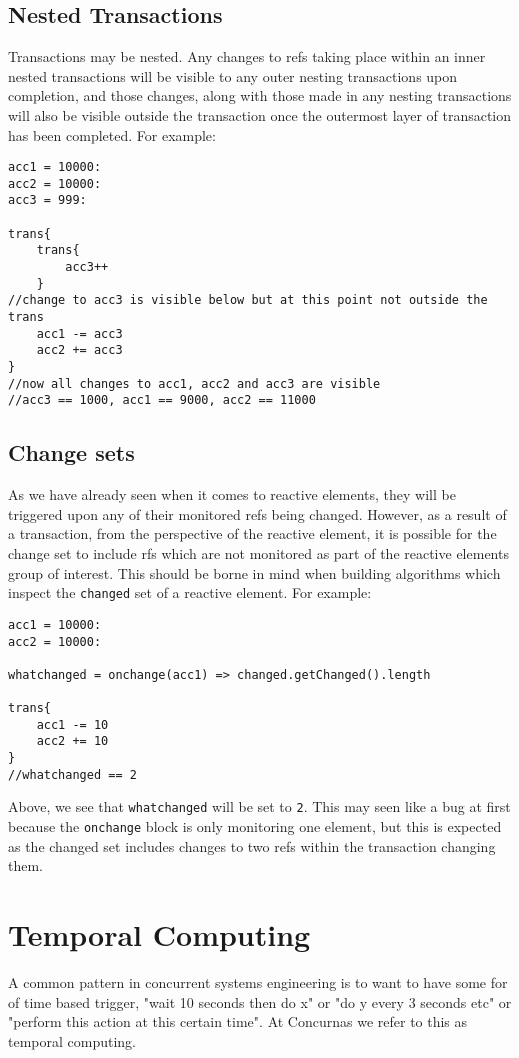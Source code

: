 \documentclass[conc-doc]{subfiles}
\begin{document}
\subsection{Nested Transactions}
Transactions may be nested. Any changes to refs taking place within an inner nested transactions will be visible to any outer nesting transactions upon completion, and those changes, along with those made in any nesting transactions will also be visible outside the transaction once the outermost layer of transaction has been completed. For example:

\begin{lstlisting}
acc1 = 10000:
acc2 = 10000:
acc3 = 999:

trans{
	trans{
		acc3++
	}
//change to acc3 is visible below but at this point not outside the trans
	acc1 -= acc3
	acc2 += acc3
}
//now all changes to acc1, acc2 and acc3 are visible
//acc3 == 1000, acc1 == 9000, acc2 == 11000
\end{lstlisting}

\subsection{Change sets}
As we have already seen when it comes to reactive elements, they will be triggered upon any of their monitored refs being changed. However, as a result of a transaction, from the perspective of the reactive element, it is possible for the change set to include rfs which are not monitored as part of the reactive elements group of interest. This should be borne in mind when building algorithms which inspect the \lstinline{changed} set of a reactive element. For example:


\begin{lstlisting}
acc1 = 10000:
acc2 = 10000:

whatchanged = onchange(acc1) => changed.getChanged().length

trans{
	acc1 -= 10
	acc2 += 10
}
//whatchanged == 2
\end{lstlisting}

Above, we see that \lstinline{whatchanged} will be set to \lstinline{2}. This may seen like a bug at first because the \lstinline{onchange} block is only monitoring one element, but this is expected as the changed set includes changes to two refs within the transaction changing them.

\section{Temporal Computing}
A common pattern in concurrent systems engineering is to want to have some for of time based trigger, "wait 10 seconds then do x" or "do y every 3 seconds etc" or "perform this action at this certain time". At Concurnas we refer to this as temporal computing.
\end{document}
